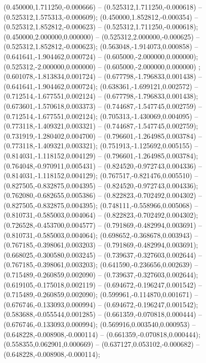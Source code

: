  (0.450000,1.711250,-0.000666) -- (0.525312,1.711250,-0.000618) -- (0.525312,1.575313,-0.000609);
 (0.450000,1.852812,-0.000354) -- (0.525312,1.852812,-0.000623) -- (0.525312,1.711250,-0.000618);
 (0.450000,2.000000,0.000000) -- (0.525312,2.000000,-0.000625) -- (0.525312,1.852812,-0.000623);
 (0.563048,-1.914073,0.000858) -- (0.641641,-1.904462,0.000724) -- (0.605000,-2.000000,0.000000);
 (0.525312,-2.000000,0.000000) -- (0.605000,-2.000000,0.000000) ;
 (0.601078,-1.813834,0.001724) -- (0.677798,-1.796833,0.001438) -- (0.641641,-1.904462,0.000724);
 (0.638361,-1.699121,0.002572) -- (0.712514,-1.677551,0.002124) -- (0.677798,-1.796833,0.001438);
 (0.673601,-1.570618,0.003373) -- (0.744687,-1.547745,0.002759) -- (0.712514,-1.677551,0.002124);
 (0.705313,-1.430069,0.004095) -- (0.773118,-1.409321,0.003321) -- (0.744687,-1.547745,0.002759);
 (0.731919,-1.280402,0.004700) -- (0.796601,-1.264985,0.003784) -- (0.773118,-1.409321,0.003321);
 (0.751913,-1.125692,0.005155) -- (0.814031,-1.118152,0.004129) -- (0.796601,-1.264985,0.003784);
 (0.764048,-0.970911,0.005431) -- (0.824520,-0.972743,0.004336) -- (0.814031,-1.118152,0.004129);
 (0.767517,-0.821476,0.005510) -- (0.827505,-0.832875,0.004395) -- (0.824520,-0.972743,0.004336);
 (0.762080,-0.682655,0.005386) -- (0.822823,-0.702492,0.004302) -- (0.827505,-0.832875,0.004395);
 (0.748111,-0.558966,0.005068) -- (0.810731,-0.585003,0.004064) -- (0.822823,-0.702492,0.004302);
 (0.726528,-0.453700,0.004577) -- (0.791869,-0.482994,0.003691) -- (0.810731,-0.585003,0.004064);
 (0.698652,-0.368678,0.003943) -- (0.767185,-0.398061,0.003203) -- (0.791869,-0.482994,0.003691);
 (0.668025,-0.300580,0.003245) -- (0.739637,-0.327603,0.002644) -- (0.767185,-0.398061,0.003203);
 (0.641590,-0.236656,0.002639) -- (0.715489,-0.260859,0.002090) -- (0.739637,-0.327603,0.002644);
 (0.619105,-0.175018,0.002119) -- (0.694672,-0.196247,0.001542) -- (0.715489,-0.260859,0.002090);
 (0.599961,-0.114870,0.001671) -- (0.676746,-0.133093,0.000994) -- (0.694672,-0.196247,0.001542);
 (0.583688,-0.055544,0.001285) -- (0.661359,-0.070818,0.000444) -- (0.676746,-0.133093,0.000994);
 (0.569916,0.003540,0.000953) -- (0.648228,-0.008908,-0.000114) -- (0.661359,-0.070818,0.000444);
 (0.558355,0.062901,0.000669) -- (0.637127,0.053102,-0.000682) -- (0.648228,-0.008908,-0.000114);
